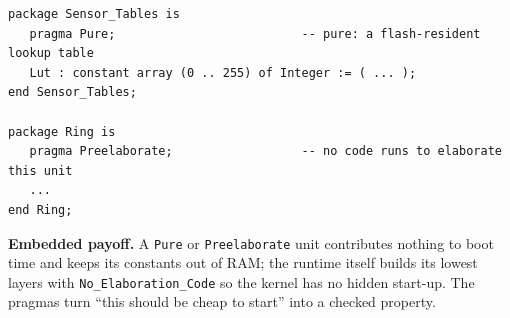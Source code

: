 \begin{lstlisting}
package Sensor_Tables is
   pragma Pure;                          -- pure: a flash-resident lookup table
   Lut : constant array (0 .. 255) of Integer := ( ... );
end Sensor_Tables;

package Ring is
   pragma Preelaborate;                  -- no code runs to elaborate this unit
   ...
end Ring;
\end{lstlisting}

\textbf{Embedded payoff.} A \texttt{Pure} or \texttt{Preelaborate} unit
contributes nothing to boot time and keeps its constants out of RAM; the runtime
itself builds its lowest layers with \texttt{No\_Elaboration\_Code} so the kernel
has no hidden start-up. The pragmas turn ``this should be cheap to start'' into a
checked property.

